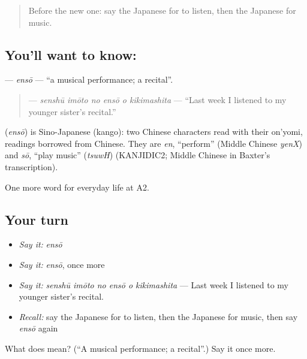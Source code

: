 \label{lesson:JA-C236-ensou}



\begin{quote}
Before the new one: say the Japanese for to listen, then the Japanese for music.
\end{quote}

\subsection*{You'll want to know: }
\textbf{} — \emph{ensō} — \textquotedblleft{}a musical performance; a recital\textquotedblright{}.

\begin{quote}
\textbf{   } — \emph{senshū imōto no ensō o kikimashita} — \textquotedblleft{}Last week I listened to my younger sister's recital.\textquotedblright{}
\end{quote}

\begin{cousinweb}
\textbf{} (\emph{ensō}) is Sino-Japanese (kango): two Chinese characters read with their on'yomi, readings borrowed from Chinese. They are \emph{en}, \textquotedblleft{}perform\textquotedblright{} (Middle Chinese \emph{yenX}) and \emph{sō}, \textquotedblleft{}play music\textquotedblright{} (\emph{tsuwH}) (KANJIDIC2; Middle Chinese in Baxter's transcription).
\end{cousinweb}

\begin{grammarlens}[title={What you've built}]
One more word for everyday life at A2.
\end{grammarlens}

\subsection*{Your turn}
\begin{itemize}
\raggedright
  \item \emph{Say it:} \emph{ensō}
  \item \emph{Say it:} \emph{ensō}, once more
  \item \emph{Say it:} \emph{senshū imōto no ensō o kikimashita} — Last week I listened to my younger sister's recital.
  \item \emph{Recall:} say the Japanese for to listen, then the Japanese for music, then say \emph{ensō} again
\end{itemize}

\begin{tcolorbox}[breakable,colback=teal!4,colframe=teal!35!black,title={Before you move on}]
What does  mean? (\textquotedblleft{}A musical performance; a recital\textquotedblright{}.) Say it once more.
\end{tcolorbox}

